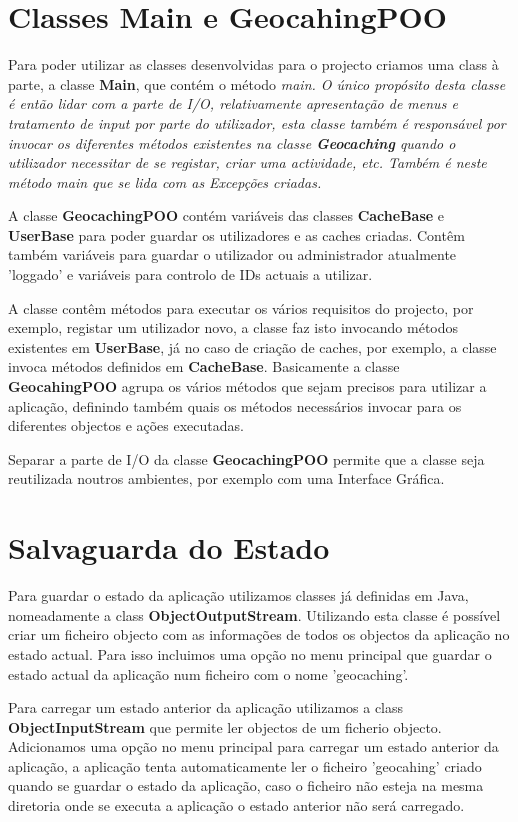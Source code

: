 \documentclass{article}
\begin{document}
\section{Classes Main e GeocahingPOO}
\par Para poder utilizar as classes desenvolvidas para o projecto criamos uma class à parte, a classe \textbf{Main}, que contém
o método \em main. O único propósito desta classe é então lidar com a parte de I/O, relativamente apresentação de menus
e tratamento de input por parte do utilizador, esta classe também é responsável por invocar os diferentes métodos existentes
na classe \textbf{Geocaching} quando o utilizador necessitar de se registar, criar uma actividade, etc.
Também é neste método \em main que se lida com as Excepções criadas.
\par A classe \textbf{GeocachingPOO} contém variáveis das classes \textbf{CacheBase} e \textbf{UserBase} para poder guardar
os utilizadores e as caches criadas. Contêm também variáveis para guardar o utilizador ou administrador atualmente 'loggado'
e variáveis para controlo de IDs actuais a utilizar.
\par A classe contêm métodos para executar os vários requisitos do projecto, por exemplo, registar um utilizador novo, a classe
faz isto invocando métodos existentes em \textbf{UserBase}, já no caso de criação de caches, por exemplo, a classe invoca
métodos definidos em \textbf{CacheBase}. Basicamente a classe \textbf{GeocahingPOO} agrupa os vários métodos que sejam
precisos para utilizar a aplicação, definindo também quais os métodos necessários invocar para os diferentes objectos e ações
executadas.
\par Separar a parte de I/O da classe \textbf{GeocachingPOO} permite que a classe seja reutilizada noutros ambientes, por
exemplo com uma Interface Gráfica.

\pagebreak
\section{Salvaguarda do Estado}
\par Para guardar o estado da aplicação utilizamos classes já definidas em Java, nomeadamente a class
\textbf{ObjectOutputStream}. Utilizando esta classe é possível criar um ficheiro objecto com as informações de todos os
objectos da aplicação no estado actual. Para isso incluimos uma opção no menu principal que guardar o estado actual
da aplicação num ficheiro com o nome 'geocaching'.
\par Para carregar um estado anterior da aplicação utilizamos a class \textbf{ObjectInputStream} que permite ler objectos de
um ficherio objecto. Adicionamos uma opção no menu principal para carregar um estado anterior da aplicação, a aplicação
tenta automaticamente ler o ficheiro 'geocahing' criado quando se guardar o estado da aplicação, caso o ficheiro não esteja
na mesma diretoria onde se executa a aplicação o estado anterior não será carregado.
\end{document}
